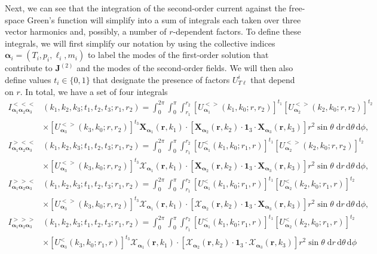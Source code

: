 \documentclass{article}
\begin{document}
Next, we can see that the integration of the second-order current against the free-space Green's function will simplify into a sum of integrals each taken over three vector harmonics and, possibly, a number of $r$-dependent factors. To define these integrals, we will first simplify our notation by using the collective indices $\bm{\alpha}_i = (T_i,p_i,\ell_i,m_i)$ to label the modes of the first-order solution that contribute to $\mathbf{J}^{(2)}$ and the modes of the second-order fields. We will then also define values $t_i\in\{0,1\}$ that designate the presence of factors $U_{T\ell}^i$ that depend on $r$. In total, we have a set of four integrals
\begin{equation}
\begin{split}
I^{<<<}_{\bm{\alpha}_1\bm{\alpha}_2\bm{\alpha}_3}&(k_1,k_2,k_3;t_1,t_2,t_3;r_1,r_2) = \int_0^{2\pi}\int_0^\pi\int_{r_1}^{r_2}\left[U_{\bm{\alpha}_1}^{<>}(k_1,k_0;r,r_2)\right]^{t_1}\left[U_{\bm{\alpha}_2}^{<>}(k_2,k_0;r,r_2)\right]^{t_2}\\
&\times\left[U_{\bm{\alpha}_3}^{<>}(k_3,k_0;r,r_2)\right]^{t_3}\mathbf{X}_{\bm{\alpha}_1}(\mathbf{r},k_1)\cdot\left[\mathbf{X}_{\bm{\alpha}_2}(\mathbf{r},k_2)\cdot\bm{1}_3\cdot\mathbf{X}_{\bm{\alpha}_3}(\mathbf{r},k_3)\right]r^2\sin\theta\;\mathrm{d}r\,\mathrm{d}\theta\,\mathrm{d}\phi,\\[0.5em]
I^{><<}_{\bm{\alpha}_1\bm{\alpha}_2\bm{\alpha}_3}&(k_1,k_2,k_3;t_1,t_2,t_3;r_1,r_2) = \int_0^{2\pi}\int_0^\pi\int_{r_1}^{r_2}\left[U_{\bm{\alpha}_1}^{<}(k_1,k_0;r_1,r)\right]^{t_1}\left[U_{\bm{\alpha}_2}^{<>}(k_2,k_0;r,r_2)\right]^{t_2}\\
&\times\left[U_{\bm{\alpha}_3}^{<>}(k_3,k_0;r,r_2)\right]^{t_3}\bm{\mathcal{X}}_{\bm{\alpha}_1}(\mathbf{r},k_1)\cdot\left[\mathbf{X}_{\bm{\alpha}_2}(\mathbf{r},k_2)\cdot\bm{1}_3\cdot\mathbf{X}_{\bm{\alpha}_3}(\mathbf{r},k_3)\right]r^2\sin\theta\;\mathrm{d}r\,\mathrm{d}\theta\,\mathrm{d}\phi,\\[0.5em]
I^{>><}_{\bm{\alpha}_1\bm{\alpha}_2\bm{\alpha}_3}&(k_1,k_2,k_3;t_1,t_2,t_3;r_1,r_2) = \int_0^{2\pi}\int_0^\pi\int_{r_1}^{r_2}\left[U_{\bm{\alpha}_1}^{<}(k_1,k_0;r_1,r)\right]^{t_1}\left[U_{\bm{\alpha}_2}^{<}(k_2,k_0;r_1,r)\right]^{t_2}\\
&\times\left[U_{\bm{\alpha}_3}^{<>}(k_3,k_0;r,r_2)\right]^{t_3}\bm{\mathcal{X}}_{\bm{\alpha}_1}(\mathbf{r},k_1)\cdot\left[\bm{\mathcal{X}}_{\bm{\alpha}_2}(\mathbf{r},k_2)\cdot\bm{1}_3\cdot\mathbf{X}_{\bm{\alpha}_3}(\mathbf{r},k_3)\right]r^2\sin\theta\;\mathrm{d}r\,\mathrm{d}\theta\,\mathrm{d}\phi,\\[0.5em]
I^{>>>}_{\bm{\alpha}_1\bm{\alpha}_2\bm{\alpha}_3}&(k_1,k_2,k_3;t_1,t_2,t_3;r_1,r_2) = \int_0^{2\pi}\int_0^\pi\int_{r_1}^{r_2}\left[U_{\bm{\alpha}_1}^{<}(k_1,k_0;r_1,r)\right]^{t_1}\left[U_{\bm{\alpha}_2}^{<}(k_2,k_0;r_1,r)\right]^{t_2}\\
&\times\left[U_{\bm{\alpha}_3}^{<}(k_3,k_0;r_1,r)\right]^{t_3}\bm{\mathcal{X}}_{\bm{\alpha}_1}(\mathbf{r},k_1)\cdot\left[\bm{\mathcal{X}}_{\bm{\alpha}_2}(\mathbf{r},k_2)\cdot\bm{1}_3\cdot\bm{\mathcal{X}}_{\bm{\alpha}_3}(\mathbf{r},k_3)\right]r^2\sin\theta\;\mathrm{d}r\,\mathrm{d}\theta\,\mathrm{d}\phi
\end{split}
\end{equation} 
\end{document}
